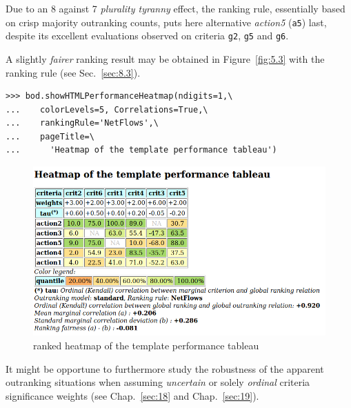 Due to an 8 against 7 \emph{plurality tyranny} effect, the \Copeland ranking rule, essentially based on crisp majority outranking counts, puts here alternative \emph{action5} (\texttt{a5}) last, despite its excellent evaluations observed on criteria \texttt{g2}, \texttt{g5} and \texttt{g6}.

A slightly \emph{fairer} ranking result may be obtained in Figure~\vref{fig:5.3} with the \NetFlows ranking rule (see Sec.~\ref{sec:8.3}).
\begin{lstlisting}
>>> bod.showHTMLPerformanceHeatmap(ndigits=1,\
...    colorLevels=5, Correlations=True,\
...    rankingRule='NetFlows',\
...    pageTitle=\
...      'Heatmap of the template performance tableau')
\end{lstlisting}
\begin{figure}[ht]
\includegraphics[width=\hsize]{Figures/5-3-templateHeatmapNF.png}
\caption{\NetFlows ranked heatmap of the template performance tableau}
\label{fig:5.3}       %
\end{figure}
\vspace{\baselineskip}
It might be opportune to furthermore study the robustness of the apparent outranking situations when assuming \emph{uncertain} or solely \emph{ordinal} criteria significance weights (see Chap.~\ref{sec:18} and Chap.~\ref{sec:19}). 
 
%


